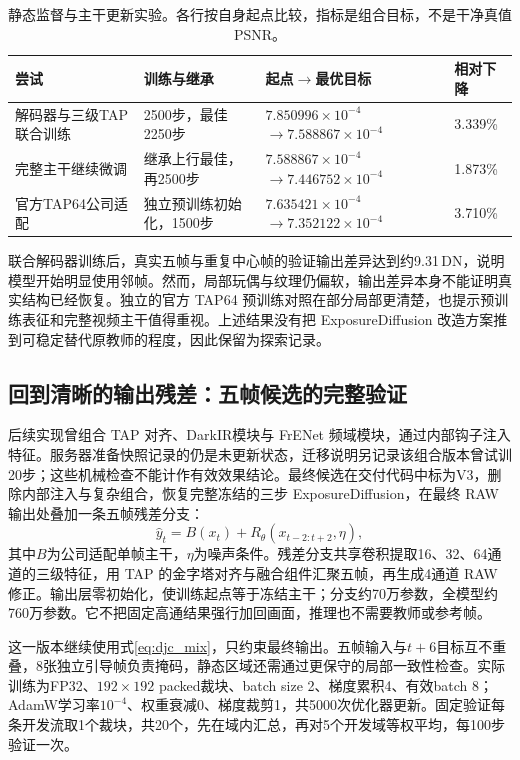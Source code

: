 \documentclass[11pt,a4paper,UTF8,fontset=fandol]{ctexart}
\newcommand{\dn}{\ensuremath{\,\mathrm{DN}}}
\begin{document}
\begin{table}[H]
\centering\small
\caption{静态监督与主干更新实验。各行按自身起点比较，指标是组合目标，不是干净真值PSNR。}
\label{tab:djc_unfreeze}
\begin{tabular}{P{0.22\textwidth}P{0.23\textwidth}P{0.28\textwidth}P{0.14\textwidth}}
\toprule
尝试 & 训练与继承 & 起点$\rightarrow$最优目标 & 相对下降 \\
\midrule
解码器与三级TAP联合训练 & 2500步，最佳2250步 & $7.850996\times10^{-4}$ $\rightarrow 7.588867\times10^{-4}$ & 3.339\% \\
完整主干继续微调 & 继承上行最佳，再2500步 & $7.588867\times10^{-4}$ $\rightarrow 7.446752\times10^{-4}$ & 1.873\% \\
官方TAP64公司适配 & 独立预训练初始化，1500步 & $7.635421\times10^{-4}$ $\rightarrow 7.352122\times10^{-4}$ & 3.710\% \\
\bottomrule
\end{tabular}
\end{table}

联合解码器训练后，真实五帧与重复中心帧的验证输出差异达到约9.31\dn，说明模型开始明显使用邻帧。然而，局部玩偶与纹理仍偏软，输出差异本身不能证明真实结构已经恢复。独立的官方 TAP64 预训练对照在部分局部更清楚，也提示预训练表征和完整视频主干值得重视。上述结果没有把 ExposureDiffusion 改造方案推到可稳定替代原教师的程度，因此保留为探索记录。

\subsection{回到清晰的输出残差：五帧候选的完整验证}

后续实现曾组合 TAP 对齐、DarkIR模块与 FrENet 频域模块，通过内部钩子注入特征。服务器准备快照记录的仍是未更新状态，迁移说明另记录该组合版本曾试训20步；这些机械检查不能计作有效效果结论。最终候选在交付代码中标为V3，删除内部注入与复杂组合，恢复完整冻结的三步 ExposureDiffusion，在最终 RAW 输出处叠加一条五帧残差分支：
\begin{equation}
 \widehat y_t=B(x_t)+R_\theta(x_{t-2:t+2},\eta),
 \label{eq:djc_v3}
\end{equation}
其中$B$为公司适配单帧主干，$\eta$为噪声条件。残差分支共享卷积提取16、32、64通道的三级特征，用 TAP 的金字塔对齐与融合组件汇聚五帧，再生成4通道 RAW 修正。输出层零初始化，使训练起点等于冻结主干；分支约70万参数，全模型约760万参数。它不把固定高通结果强行加回画面，推理也不需要教师或参考帧。

这一版本继续使用式\eqref{eq:djc_mix}，只约束最终输出。五帧输入与$t+6$目标互不重叠，8张独立引导帧负责掩码，静态区域还需通过更保守的局部一致性检查。实际训练为FP32、$192\times192$ packed裁块、batch size 2、梯度累积4、有效batch 8；AdamW学习率$10^{-4}$、权重衰减0、梯度裁剪1，共5000次优化器更新。固定验证每条开发流取1个裁块，共20个，先在域内汇总，再对5个开发域等权平均，每100步验证一次。
\end{document}
